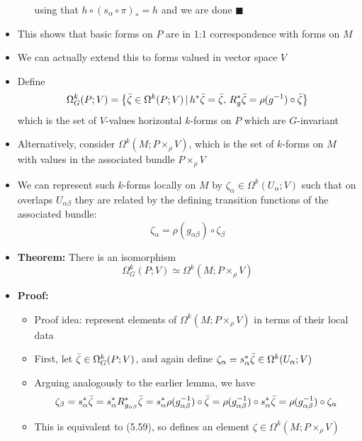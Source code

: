\documentclass[12pt,a4paper]{article}
\numberwithin{equation}{section}
\begin{document}
\begin{itemize}
\begin{itemize}
$$			$$
			using that $h\circ(s_{\alpha}\circ\pi)_{*}=h$ and we are done $\blacksquare$
		\end{itemize} 
		\item This shows that basic forms on $P$ are in 1:1 correspondence with forms on $M$
		\item We can actually extend this to forms valued in vector space $V$
		\item Define
		\begin{equation}
			\Omega_{G}^{k}(P;V)=\left\{\bar{\zeta}\in\Omega^{k}(P;V)\,|\,h^{*}\bar{\zeta}=\bar{\zeta},\,R_{g}^{*}\bar{\zeta}=\rho(g^{-1})\circ\bar{\zeta}\right\}
		\end{equation}
		which is the set of $V$-values horizontal $k$-forms on $P$ which are $G$-invariant
		\item Alternatively, consider $\Omega^{k}(M;P\times_{\rho}V)$, which is the set of $k$-forms on $M$ with values in the associated bundle $P\times_{\rho}V$
		\item We can represent such $k$-forms locally on $M$ by $\zeta_{\alpha}\in\Omega^{k}(U_{\alpha};V)$ such that on overlaps $U_{\alpha\beta}$ they are related by the defining transition functions of the associated bundle:
		\begin{equation}
			\zeta_{\alpha}=\rho(g_{\alpha\beta})\circ\zeta_{\beta}
		\end{equation}
		\item \textbf{Theorem:} There is an isomorphism
		\begin{equation}
			\Omega^{k}_{G}(P;V)\simeq\Omega^{k}(M;P\times_{\rho}V)
		\end{equation}
		\item \textbf{Proof:}
		\begin{itemize}
			\item Proof idea: represent elements of $\Omega^{k}(M;P\times_{\rho}V)$ in terms of their local data
			\item First, let $\bar{\zeta}\in\Omega^{k}_{G}(P;V)$, and again define $\zeta_{\alpha}=s_{\alpha}^{*}\bar{\zeta}\in\Omega^{k}(U_{\alpha};V)$
			\newcommand{\za}{\zeta_{\alpha}}
			\newcommand{\zb}{\zeta_{\beta}}
			\item Arguing analogously to the earlier lemma, we have
			$$
			\zb=s_{\alpha}^{*}\bz=s_{\alpha}^{*}R^{*}_{g_{\alpha\beta}}\bz=s_{\alpha}^{*}\rho(g^{-1}_{\alpha\beta})\circ\bz=\rho(g^{-1}_{\alpha\beta})\circ s_{\alpha}^{*}\bz=\rho(g^{-1}_{\alpha\beta})\circ\za
			$$
			\item This is equivalent to (5.59), so defines an element $\zeta\in\Omega^{k}(M;P\times_{\rho}V)$

\end{itemize}
\end{itemize}
\end{document}

